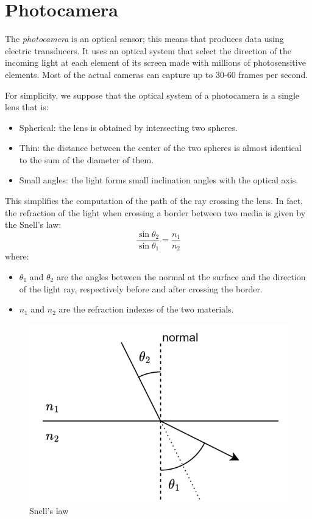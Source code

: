 \documentclass[12pt, a4paper]{report}
\begin{document}
    \section{Photocamera}
    \begin{definition}
    The \emph{photocamera} is an optical sensor; this means that produces data using electric transducers. It uses an optical system that select the direction of the incoming light at each 
    element of its screen made with millions of photosensitive elements. Most of the actual cameras can capture up to 30-60 frames per second. 
    \end{definition}
    For simplicity, we suppose that the optical system of a photocamera is a single lens that is:
    \begin{itemize}
        \item Spherical: the lens is obtained by intersecting two spheres. 
        \item Thin: the distance between the center of the two spheres is almost identical to the sum of the diameter of them. 
        \item Small angles: the light forms small inclination angles with the optical axis.
    \end{itemize}
    This simplifies the computation of the path of the ray crossing the lens. In fact, the refraction of the light when crossing a border between two media is given by the Snell's law: 
    \[\dfrac{\sin{\theta_2}}{\sin{\theta_1}}=\dfrac{n_1}{n_2}\]
    where: 
    \begin{itemize}
        \item $\theta_1$ and $\theta_2$ are the angles between the normal at the surface and the direction of the light ray, respectively before and after crossing the border. 
        \item $n_1$ and $n_2$ are the refraction indexes of the two materials.
    \end{itemize}
    \begin{figure}[H]
        \centering
        \includegraphics[width=0.5\linewidth]{images/refraction.png}
        \caption{Snell's law}
    \end{figure}
\end{document}
